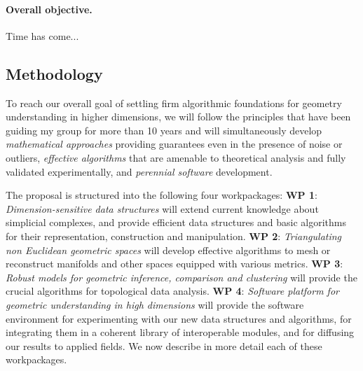 \paragraph{Overall objective.}
Time has come...





\subsection{Methodology}
To reach our overall goal of settling firm algorithmic foundations for geometry understanding in higher dimensions, we will follow the principles that have been guiding my group for more than 10 years and will simultaneously develop
{\em mathematical approaches} providing guarantees even in the presence of noise or outliers,
{\em effective algorithms} that are amenable to theoretical analysis and fully validated experimentally,
and {\em perennial software} development.

The proposal is structured into the following four workpackages:
{\bf WP 1}:  {\em Dimension-sensitive data  structures} will extend current knowledge about simplicial complexes, and  provide efficient data structures and basic algorithms for their representation, construction and manipulation. 
  {\bf WP 2}:  {\em Triangulating non Euclidean geometric spaces} will develop effective algorithms to mesh or reconstruct manifolds and other spaces equipped with various metrics.   {\bf WP 3}: {\em Robust models for geometric inference, comparison and  clustering} will provide the crucial  algorithms for topological data analysis.
 {\bf WP 4}:  {\em  Software platform for geometric understanding in high dimensions} will provide the software environment for experimenting with our new data structures and algorithms, for integrating them in a coherent library of interoperable modules, and for diffusing our results to applied fields. We now describe in more detail each of these workpackages.



